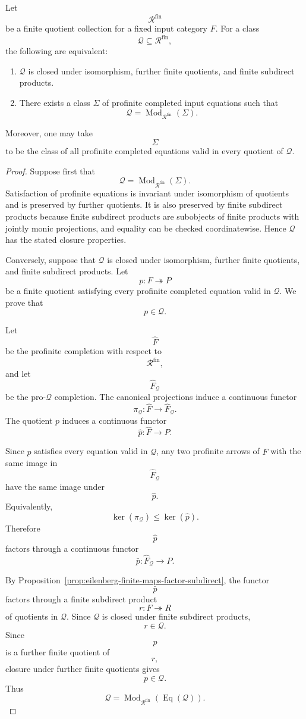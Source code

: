 \begin{theorem}
\label{thm:eilenberg-finite-profinite-reiterman}
Let
\[
\mathcal R^{\mathrm{fin}}
\]
be a finite quotient collection for a fixed input category \(F\). For a class
\[
\mathcal Q\subseteq\mathcal R^{\mathrm{fin}},
\]
the following are equivalent:
\begin{enumerate}
\item \(\mathcal Q\) is closed under isomorphism, further finite quotients,
and finite subdirect products.
\item There exists a class \(\Sigma\) of profinite completed input equations
such that
\[
\mathcal Q=\operatorname{Mod}_{\mathcal R^{\mathrm{fin}}}(\Sigma).
\]
\end{enumerate}
Moreover, one may take
\[
\Sigma
\]
to be the class of all profinite completed equations valid in every quotient
of \(\mathcal Q\).
\end{theorem}

\begin{proof}
Suppose first that
\[
\mathcal Q=\operatorname{Mod}_{\mathcal R^{\mathrm{fin}}}(\Sigma).
\]
Satisfaction of profinite equations is invariant under isomorphism of
quotients and is preserved by further quotients. It is also preserved by
finite subdirect products because finite subdirect products are subobjects of
finite products with jointly monic projections, and equality can be checked
coordinatewise. Hence \(\mathcal Q\) has the stated closure properties.

Conversely, suppose that \(\mathcal Q\) is closed under isomorphism, further
finite quotients, and finite subdirect products. Let
\[
p:F\twoheadrightarrow P
\]
be a finite quotient satisfying every profinite completed equation valid in
\(\mathcal Q\). We prove that
\[
p\in\mathcal Q.
\]

Let
\[
\widehat F
\]
be the profinite completion with respect to
\[
\mathcal R^{\mathrm{fin}},
\]
and let
\[
\widehat F_{\mathcal Q}
\]
be the pro-\(\mathcal Q\) completion. The canonical projections induce a
continuous functor
\[
\pi_{\mathcal Q}:\widehat F\to\widehat F_{\mathcal Q}.
\]
The quotient \(p\) induces a continuous functor
\[
\widehat p:\widehat F\to P.
\]

Since \(p\) satisfies every equation valid in \(\mathcal Q\), any two
profinite arrows of \(\widehat F\) with the same image in
\[
\widehat F_{\mathcal Q}
\]
have the same image under
\[
\widehat p.
\]
Equivalently,
\[
\ker(\pi_{\mathcal Q})\leq\ker(\widehat p).
\]
Therefore
\[
\widehat p
\]
factors through a continuous functor
\[
\bar p:\widehat F_{\mathcal Q}\to P.
\]

By Proposition~\ref{prop:eilenberg-finite-maps-factor-subdirect}, the functor
\[
\bar p
\]
factors through a finite subdirect product
\[
r:F\twoheadrightarrow R
\]
of quotients in \(\mathcal Q\). Since \(\mathcal Q\) is closed under finite
subdirect products,
\[
r\in\mathcal Q.
\]
Since
\[
p
\]
is a further finite quotient of
\[
r,
\]
closure under further finite quotients gives
\[
p\in\mathcal Q.
\]
Thus
\[
\mathcal Q
=
\operatorname{Mod}_{\mathcal R^{\mathrm{fin}}}(\operatorname{Eq}(\mathcal Q)).
\]
\end{proof}

